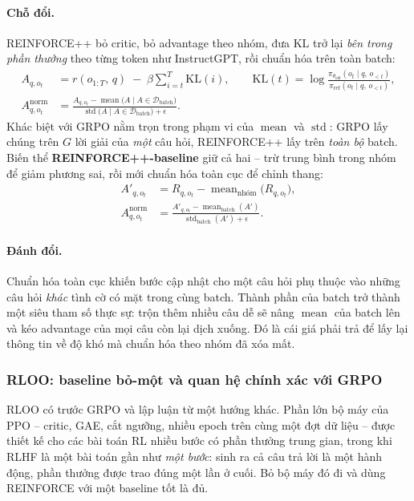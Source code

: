 \paragraph{Chỗ đổi.}
REINFORCE++ bỏ critic, bỏ advantage theo nhóm, đưa KL trở lại \emph{bên trong phần thưởng} theo từng token như InstructGPT, rồi chuẩn hóa trên toàn batch:
\[
\begin{aligned}
A_{q,o_t} &= r(o_{1:T},\, q) \;-\; \beta \sum_{i=t}^{T} \mathrm{KL}(i),
\qquad
\mathrm{KL}(t) = \log\frac{\pi_{\theta_{\mathrm{old}}}(o_t\mid q,\, o_{<t})}{\pi_{\mathrm{ref}}(o_t\mid q,\, o_{<t})},\\[4pt]
A^{\mathrm{norm}}_{q,o_t} &= \frac{A_{q,o_t} - \operatorname{mean}\big(A \mid A \in \mathcal{D}_{\mathrm{batch}}\big)}{\operatorname{std}\big(A \mid A \in \mathcal{D}_{\mathrm{batch}}\big) + \epsilon}.
\end{aligned}
\]
Khác biệt với GRPO nằm trọn trong phạm vi của $\operatorname{mean}$ và $\operatorname{std}$: GRPO lấy chúng trên $G$ lời giải của \emph{một} câu hỏi, REINFORCE++ lấy trên \emph{toàn bộ} batch. Biến thể \textbf{REINFORCE++-baseline} giữ cả hai -- trừ trung bình trong nhóm để giảm phương sai, rồi mới chuẩn hóa toàn cục để chỉnh thang:
\[
\begin{aligned}
A'_{q,o_t} &= R_{q,o_t} - \operatorname{mean}_{\text{nhóm}}\big(R_{q,o_t}\big),\\[4pt]
A^{\mathrm{norm}}_{q,o_t} &= \frac{A'_{q,o_t} - \operatorname{mean}_{\text{batch}}(A')}{\operatorname{std}_{\text{batch}}(A') + \epsilon}.
\end{aligned}
\]

\paragraph{Đánh đổi.}
Chuẩn hóa toàn cục khiến bước cập nhật cho một câu hỏi phụ thuộc vào những câu hỏi \emph{khác} tình cờ có mặt trong cùng batch. Thành phần của batch trở thành một siêu tham số thực sự: trộn thêm nhiều câu dễ sẽ nâng $\operatorname{mean}$ của batch lên và kéo advantage của mọi câu còn lại dịch xuống. Đó là cái giá phải trả để lấy lại thông tin về độ khó mà chuẩn hóa theo nhóm đã xóa mất.

\subsubsection{RLOO: baseline bỏ-một và quan hệ chính xác với GRPO}

RLOO \cite{ahmadian2024rloo} có trước GRPO và lập luận từ một hướng khác. Phần lớn bộ máy của PPO -- critic, GAE, cắt ngưỡng, nhiều epoch trên cùng một đợt dữ liệu -- được thiết kế cho các bài toán RL nhiều bước có phần thưởng trung gian, trong khi RLHF là một bài toán gần như \emph{một bước}: sinh ra cả câu trả lời là một hành động, phần thưởng được trao đúng một lần ở cuối. Bỏ bộ máy đó đi và dùng REINFORCE với một baseline tốt là đủ.

